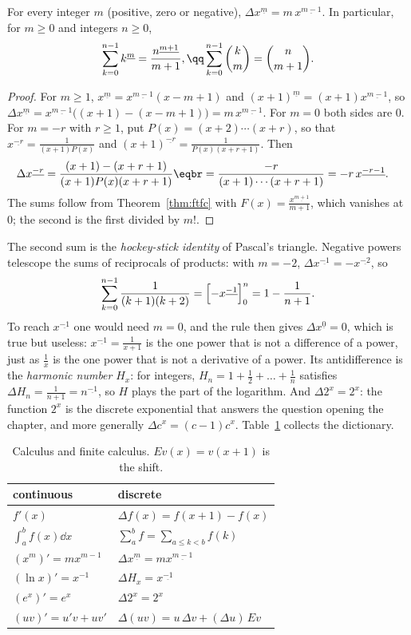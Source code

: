 \begin{proposition}\label{prop:falling}
For every integer $m$ (positive, zero or negative), $\Delta x^{\underline m}=m\,x^{\underline{m-1}}$. In particular,
for $m\ge0$ and integers $n\ge0$,
\[
\sum_{k=0}^{n-1}k^{\underline m}=\frac{n^{\underline{m+1}}}{m+1},\qq\sum_{k=0}^{n-1}\binom km=\binom n{m+1}.
\]
\end{proposition}
\begin{proof}
For $m\ge1$, $x^{\underline m}=x^{\underline{m-1}}(x-m+1)$ and $(x+1)^{\underline m}=(x+1)x^{\underline{m-1}}$, so
$\Delta x^{\underline m}=x^{\underline{m-1}}\bigl((x+1)-(x-m+1)\bigr)=m\,x^{\underline{m-1}}$. For $m=0$ both sides are
$0$. For $m=-r$ with $r\ge1$, put $P(x)=(x+2)\cdots(x+r)$, so that $x^{\underline{-r}}=\frac1{(x+1)P(x)}$ and
$(x+1)^{\underline{-r}}=\frac1{P(x)(x+r+1)}$. Then
\[
\begin{aligned}\Delta x^{\underline{-r}}&=\frac{(x+1)-(x+r+1)}{(x+1)P(x)(x+r+1)}\eqbr=\frac{-r}{(x+1)\cdots(x+r+1)}=-r\,x^{\underline{-r-1}}.\end{aligned}
\]
The sums follow from Theorem~\ref{thm:ftfc} with $F(x)=\frac{x^{\underline{m+1}}}{m+1}$, which vanishes at $0$; the
second is the first divided by $m!$.
\end{proof}

The second sum is the \emph{hockey-stick identity} of Pascal's triangle. Negative powers telescope the sums of
reciprocals of products: with $m=-2$, $\Delta x^{\underline{-1}}=-x^{\underline{-2}}$, so
\[
\sum_{k=0}^{n-1}\frac1{(k+1)(k+2)}=\Bigl[-x^{\underline{-1}}\Bigr]_0^n=1-\frac1{n+1}.
\]
To reach $x^{\underline{-1}}$ one would need $m=0$, and the rule then gives $\Delta x^{\underline 0}=0$, which is true but useless: $x^{\underline{-1}}=\frac1{x+1}$
is the one power that is not a difference of a power, just as $\frac1x$ is the one power that is not a derivative of a
power. Its antidifference is the \emph{harmonic number} $H_x$: for integers, $H_n=1+\frac12+\dots+\frac1n$ satisfies
$\Delta H_n=\frac1{n+1}=n^{\underline{-1}}$, so $H$ plays the part of the logarithm. And $\Delta2^x=2^x$: the function
$2^x$ is the discrete exponential that answers the question opening the chapter, and more generally
$\Delta c^x=(c-1)c^x$. Table~\ref{tab:dictionary} collects the dictionary.

\begin{table}[ht]
\centering
\begin{tabular}{ll}
\hline
continuous & discrete\\
\hline
$f'(x)$ & $\Delta f(x)=f(x+1)-f(x)$\\
$\int_a^bf(x)\dd x$ & $\sum_a^bf=\sum_{a\le k<b}f(k)$\\
$(x^m)'=mx^{m-1}$ & $\Delta x^{\underline m}=mx^{\underline{m-1}}$\\
$(\ln x)'=x^{-1}$ & $\Delta H_x=x^{\underline{-1}}$\\
$(e^x)'=e^x$ & $\Delta2^x=2^x$\\
$(uv)'=u'v+uv'$ & $\Delta(uv)=u\,\Delta v+(\Delta u)\,Ev$\\
\hline
\end{tabular}
\caption{Calculus and finite calculus. $Ev(x)=v(x+1)$ is the shift.}
\label{tab:dictionary}
\end{table}

